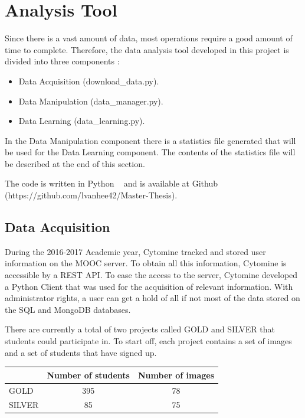 \documentclass[a4paper,11pt]{report}
\numberwithin{figure}{chapter} %
\begin{document}
    \section{Analysis Tool}
    	Since there is a vast amount of data, most operations require a good amount of time to complete.
    	Therefore, the data analysis tool developed in this project is divided into three components :
        \begin{itemize}
        \item[\textbullet] Data Acquisition (download\_data.py).
        \item[\textbullet] Data Manipulation (data\_manager.py).
        \item[\textbullet] Data Learning (data\_learning.py).
        \end{itemize}

        In the Data Manipulation component there is a statistics file generated that will be used for the Data Learning component.
        The contents of the statistics file will be described at the end of this section.

        The code is written in Python ~\cite{pyth} and is available at Github (https://github.com/lvanhee42/Master-Thesis).

		\subsection{Data Acquisition}

			During the 2016-2017 Academic year, Cytomine tracked and stored user information on the MOOC server.
			To obtain all this information, Cytomine is accessible by a REST API. To ease the access to the server, Cytomine developed a Python Client that was used for the acquisition of relevant information.
			With administrator rights, a user can get a hold of all if not most of the data stored on the SQL and MongoDB databases.

          There are currently a total of two projects called GOLD and SILVER that students could participate in.
          To start off, each project contains a set of images and a set of students that have signed up.

          \begin{center}
          \begin{tabular}{| l | c | c |}
          \hline
           & Number of students & Number of images \\ \hline
           GOLD & 395 & 78 \\ \hline
           SILVER & 85 & 75 \\
          \hline
          \end{tabular}
          \end{center}
\end{document}
